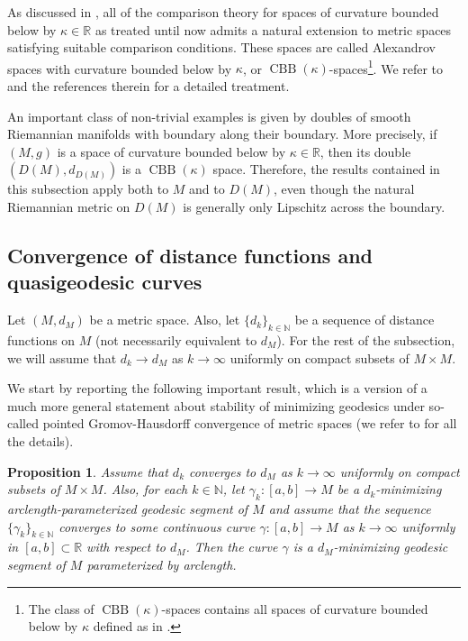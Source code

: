 \documentclass[11pt]{article}
\theoremstyle{definition}
\theoremstyle{remark}
\theoremstyle{plain}
\newtheorem{proposition}[definition]{Proposition}
\DeclareMathOperator{\CBB}{CBB}
\newcommand{\R}{\mathbb{R}}
\newcommand{\N}{\mathbb{N}}
\begin{document}
As discussed in \cite{PetruninSemiconcave}, all of the comparison theory for spaces of curvature bounded below by $\kappa\in \R$ as treated until now admits a natural extension to metric spaces satisfying suitable comparison conditions. These spaces are called Alexandrov spaces with curvature bounded below by $\kappa$, or $\CBB(\kappa)$-spaces\footnote{The class of $\CBB(\kappa)$-spaces contains all spaces of curvature bounded below by $\kappa$ defined as in .}. We refer to \cite{Course} and the references therein for a detailed treatment.

An important class of non-trivial examples is given by doubles of smooth Riemannian manifolds with boundary along their boundary. More precisely, if $(M,g)$ is a space of curvature bounded below by $\kappa\in \R$, then its double $(D(M),d_{D(M)})$ is a $\CBB(\kappa)$ space. Therefore, the results contained in this subsection apply both to $M$ and to $D(M)$, even though the natural Riemannian metric on $D(M)$ is generally only Lipschitz across the boundary.


\subsection{Convergence of distance functions and quasigeodesic curves}

Let $(M,d_M)$ be a metric space. Also, let $\{d_k\}_{k\in \N}$ be a sequence of distance functions on $M$ (not necessarily equivalent to $d_M$). For the rest of the subsection, we will assume that $d_k\to d_M$ as $k\to \infty$ uniformly on compact subsets of $M\times M$.

We start by reporting the following important result, which is a  version of a much more general statement about stability of minimizing geodesics under so-called pointed Gromov-Hausdorff convergence of metric spaces (we refer to \cite[Section 7.5]{Course} for all the details).

\begin{proposition}\label{prop:geodesic_convergence}
     Assume that $d_k$ converges to $d_M$ as $k\to \infty$ uniformly on compact subsets of $M\times M$. Also, for each $k\in \N$, let $\gamma_k:[a,b]\to M$ be a $d_k$-minimizing arclength-parameterized geodesic segment of $M$ and assume that the sequence $\{\gamma_k\}_{k\in \N}$ converges to some continuous curve $\gamma:[a,b]\to M$ as $k\to\infty$ uniformly in $[a,b]\subset \R$ with respect to $d_M$. Then the curve $\gamma$ is a $d_M$-minimizing geodesic segment of $M$ parameterized by arclength.
\end{proposition}
\end{document}
